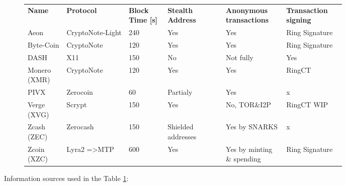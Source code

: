 \documentclass[
  printed, %
  table,   %
  lof,     %
  lot,     %
           oneside, color
]{fithesis3}
\begin{document}
\begin{figure}[H]
\centering
\begin{tabular}{p{0.1\linewidth}p{0.16\linewidth}p{0.1\linewidth}p{0.15\linewidth}p{0.15\linewidth}p{0.15\linewidth}}
\textbf{Name}        & \textbf{Protocol}                & \textbf{Block Time {[}s{]}} & \textbf{Stealth Address    }      & \textbf{Anonymous transactions} & \textbf{Transaction signing}  \\
Aeon         & CryptoNote-Light        & 240                & Yes                      & Yes                & Ring Signature \\
Byte-Coin     & CryptoNote              & 120                & Yes                      & Yes                & Ring Signature \\
DASH         & X11                     & 150                & No                       & Not fully           & Yes            \\
Monero (XMR) & CryptoNote              & 120                & Yes                      & Yes                & RingCT         \\
PIVX         & Zerocoin                & 60                 & Partialy & Yes                & x              \\
Verge (XVG)  & Scrypt                  & 150                & Yes                      & No, TOR\&I2P       & RingCT WIP     \\
Zcash (ZEC)  & Zerocash                & 150                & Shielded addresses  & Yes by SNARKS    & x              \\
Zcoin (XZC)  & Lyra2 =\textgreater MTP & 600                & Yes                      & Yes by minting \& spending  & Ring Signature

\end{tabular}
\label{table:monero-alternatives}


\end{figure}
\vspace{-2em}
Information sources used in the Table \ref{table:monero-alternatives}:\\ %
\end{document}
